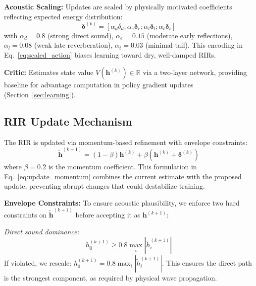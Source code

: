 \documentclass[12pt,a4paper]{article}
\begin{document}
\textbf{Acoustic Scaling:} Updates are scaled by physically motivated coefficients reflecting expected energy distribution:
\begin{equation}
\boldsymbol{\delta}^{(k)} = [\alpha_d \delta_d; \alpha_e \boldsymbol{\delta}_e; \alpha_l \boldsymbol{\delta}_l; \alpha_t \boldsymbol{\delta}_t]
\label{eq:scaled_action}
\end{equation}
with $\alpha_d=0.8$ (strong direct sound), $\alpha_e=0.15$ (moderate early reflections), $\alpha_l=0.08$ (weak late reverberation), $\alpha_t=0.03$ (minimal tail). This encoding in Eq.~\eqref{eq:scaled_action} biases learning toward dry, well-damped RIRs.

\textbf{Critic:} Estimates state value $V(\mathbf{h}^{(k)}) \in \mathbb{R}$ via a two-layer network, providing baseline for advantage computation in policy gradient updates (Section~\ref{sec:learning}).

\subsection{RIR Update Mechanism}

The RIR is updated via momentum-based refinement with envelope constraints:
\begin{equation}
\tilde{\mathbf{h}}^{(k+1)} = (1-\beta)\mathbf{h}^{(k)} + \beta(\mathbf{h}^{(k)} + \boldsymbol{\delta}^{(k)})
\label{eq:update_momentum}
\end{equation}
where $\beta=0.2$ is the momentum coefficient. This formulation in Eq.~\eqref{eq:update_momentum} combines the current estimate with the proposed update, preventing abrupt changes that could destabilize training.

\textbf{Envelope Constraints:} To ensure acoustic plausibility, we enforce two hard constraints on $\tilde{\mathbf{h}}^{(k+1)}$ before accepting it as $\mathbf{h}^{(k+1)}$:

\textit{Direct sound dominance:}
\begin{equation}
h_0^{(k+1)} \geq 0.8 \max_i |\tilde{h}_i^{(k+1)}|
\label{eq:direct_constraint}
\end{equation}
If violated, we rescale: $h_0^{(k+1)} = 0.8 \max_i |\tilde{h}_i^{(k+1)}|$. This ensures the direct path is the strongest component, as required by physical wave propagation.
\end{document}
